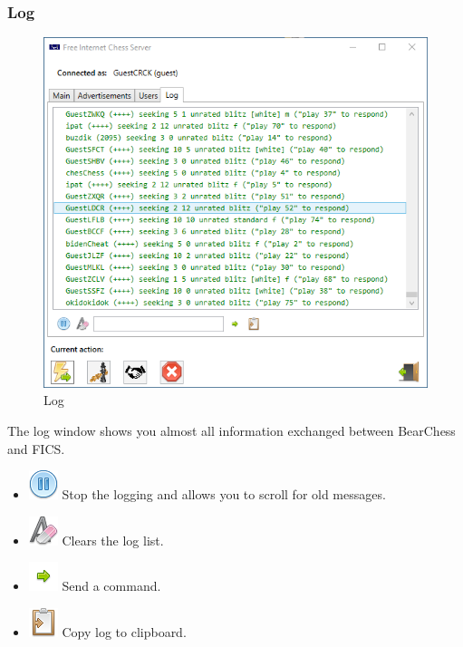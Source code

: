 \documentclass[11pt,a4paper]{article}
\begin{document}
\subsubsection{Log}
\begin{figure}[H]
	\centering
	\includegraphics[scale=0.7]{fics8.png}
	\caption{Log}
	\label{fig:ficsLog}
\end{figure}
The log window shows you almost all information exchanged between BearChess and FICS.
\begin{itemize}
	\item \includegraphics[scale=0.5]{control_pause_blue.png} Stop the logging and allows you to scroll for old messages.
	\item \includegraphics[scale=0.5]{clear_formatting.png} Clears the log list.
    \item \includegraphics[scale=0.7]{bullet_go.png} Send a command.
	\item \includegraphics[scale=0.5]{clipboard_sign.png} Copy log to clipboard.
\end{itemize}
\end{document}
